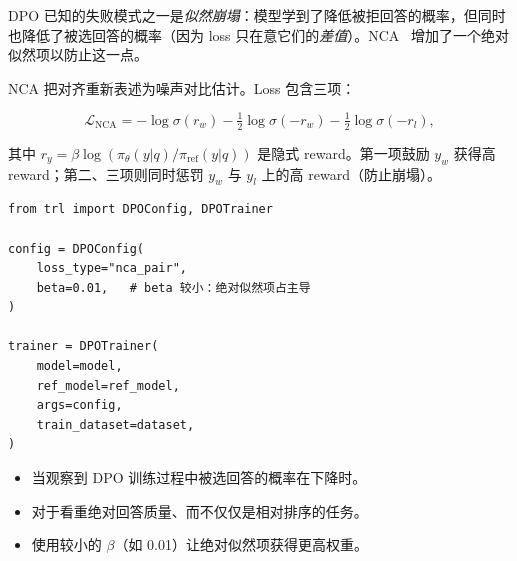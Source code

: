 \begin{intuitionbox}[DPO 的似然崩塌]
DPO 已知的失败模式之一是\emph{似然崩塌}：模型学到了降低被拒回答的概率，但同时也降低了被选回答的概率（因为 loss 只在意它们的\emph{差值}）。NCA~\cite{chen2024nca} 增加了一个绝对似然项以防止这一点。
\end{intuitionbox}

NCA 把对齐重新表述为噪声对比估计。Loss 包含三项：

\[
\boxed{
    \mathcal{L}_{\text{NCA}} =
      -\log \sigma(r_w)
      - \tfrac{1}{2}\log \sigma(-r_w)
      - \tfrac{1}{2}\log \sigma(-r_l),
  }
\]

其中 $r_y = \beta \log(\pi_\theta(y|q)/\pi_{\text{ref}}(y|q))$ 是隐式 reward。第一项鼓励 $y_w$ 获得高 reward；第二、三项则同时惩罚 $y_w$ 与 $y_l$ 上的高 reward（防止崩塌）。

\begin{examplebox}
\begin{lstlisting}[style=pythonstyle]
from trl import DPOConfig, DPOTrainer

config = DPOConfig(
    loss_type="nca_pair",
    beta=0.01,   # beta 较小：绝对似然项占主导
)

trainer = DPOTrainer(
    model=model,
    ref_model=ref_model,
    args=config,
    train_dataset=dataset,
)
\end{lstlisting}
\end{examplebox}

\begin{keybox}
\begin{itemize}
  \item 当观察到 DPO 训练过程中被选回答的概率在下降时。
  \item 对于看重绝对回答质量、而不仅仅是相对排序的任务。
  \item 使用较小的 $\beta$（如 0.01）让绝对似然项获得更高权重。
\end{itemize}
\end{keybox}

